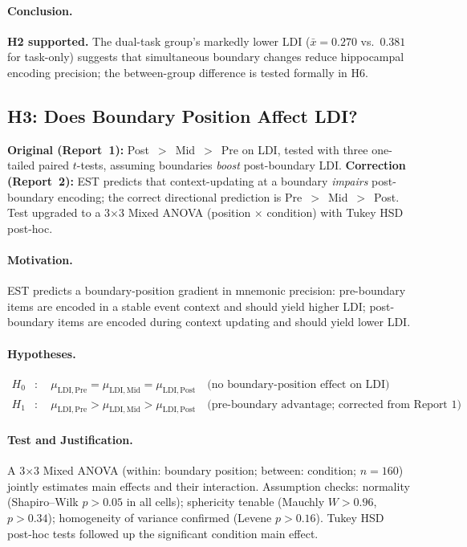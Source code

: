 \documentclass[10pt,a4paper]{article}
\begin{document}
\paragraph{Conclusion.}
\textbf{H2 supported.} The dual-task group's markedly lower LDI ($\bar{x}{=}0.270$ vs.\ $0.381$ for task-only) suggests that simultaneous boundary changes reduce hippocampal encoding precision; the between-group difference is tested formally in H6.

\subsection*{H3: Does Boundary Position Affect LDI?}

\begin{revisionbox}
\small
\textbf{Original (Report~1):} Post~$>$~Mid~$>$~Pre on LDI, tested with three one-tailed paired $t$-tests, assuming boundaries \emph{boost} post-boundary LDI. \textbf{Correction (Report~2):} EST predicts that context-updating at a boundary \emph{impairs} post-boundary encoding; the correct directional prediction is Pre~$>$~Mid~$>$~Post. Test upgraded to a 3$\times$3 Mixed ANOVA (position $\times$ condition) with Tukey HSD post-hoc.
\end{revisionbox}

\paragraph{Motivation.}
EST predicts a boundary-position gradient in mnemonic precision: pre-boundary items are encoded in a stable event context and should yield higher LDI; post-boundary items are encoded during context updating and should yield lower LDI.

\paragraph{Hypotheses.}
\begin{align*}
  H_0 &:\quad \mu_{\mathrm{LDI,Pre}} = \mu_{\mathrm{LDI,Mid}} = \mu_{\mathrm{LDI,Post}}
        \quad \text{(no boundary-position effect on LDI)} \\
  H_1 &:\quad \mu_{\mathrm{LDI,Pre}} > \mu_{\mathrm{LDI,Mid}} > \mu_{\mathrm{LDI,Post}}
        \quad \text{(pre-boundary advantage; corrected from Report~1)}
\end{align*}

\paragraph{Test and Justification.}
A 3$\times$3 Mixed ANOVA (within: boundary position; between: condition; $n{=}160$) jointly estimates main effects and their interaction. Assumption checks: normality (Shapiro--Wilk $p{>}0.05$ in all cells); sphericity tenable (Mauchly $W{>}0.96$, $p{>}0.34$); homogeneity of variance confirmed (Levene $p{>}0.16$). Tukey HSD post-hoc tests followed up the significant condition main effect.
\end{document}
